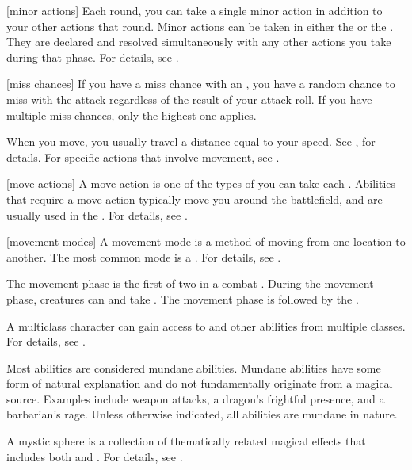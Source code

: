 [minor actions] Each round, you can take a single minor action in addition to your other actions that round.
Minor actions can be taken in either the  or the .
They are declared and resolved simultaneously with any other actions you take during that phase.
For details, see .

[miss chances] If you have a miss chance with an , you have a random chance to miss with the attack regardless of the result of your attack roll.
If you have multiple miss chances, only the highest one applies.

 When you move, you usually travel a distance equal to your speed.
See , for details.
For specific actions that involve movement, see .

[move actions] A move action is one of the types of  you can take each .
Abilities that require a move action typically move you around the battlefield, and are usually used in the .
For details, see .

[movement modes] A movement mode is a method of moving from one location to another.
The most common mode is a .
For details, see .

 The movement phase is the first of two  in a combat .
During the movement phase, creatures can  and take .
The movement phase is followed by the .

 A multiclass character can gain access to  and other abilities from multiple classes.
For details, see .

 Most abilities are considered mundane abilities.
Mundane abilities have some form of natural explanation and do not fundamentally originate from a magical source.
Examples include weapon attacks, a dragon's frightful presence, and a barbarian's rage.
Unless otherwise indicated, all abilities are mundane in nature.

 A mystic sphere is a collection of thematically related magical effects that includes both  and .
For details, see .

